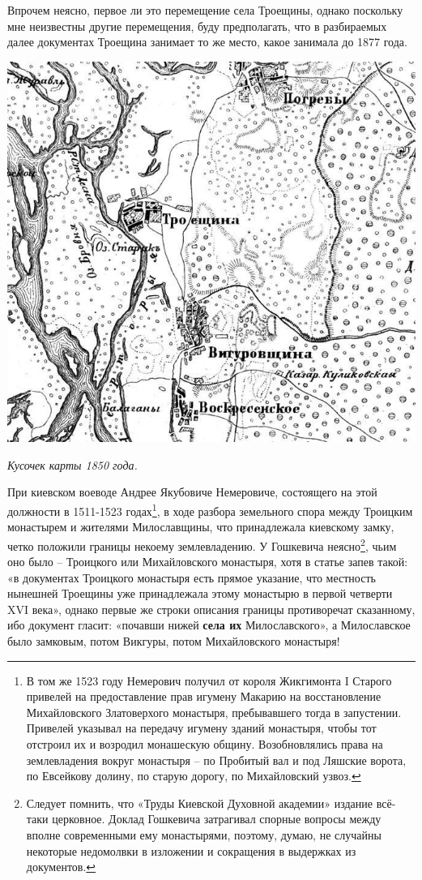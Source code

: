 Впрочем неясно, первое ли это перемещение села Троещины, однако поскольку мне неизвестны другие перемещения, буду предполагать, что в разбираемых далее документах Троещина занимает то же место, какое занимала до 1877 года.

\begin{center}
\includegraphics[width=\linewidth]{chast-gorodki/star-ist/1850.jpg}

\textit{Кусочек карты 1850 года.}
\end{center}

При киевском воеводе Андрее Якубовиче Немеровиче, состоящего на этой должности в 1511-1523 годах\footnote{В том же 1523 году Немерович получил от короля Жикгимонта I Старого привелей на предоставление прав игумену Макарию на восстановление Михайловского Златоверхого монастыря, пребывавшего тогда в запустении. Привелей указывал на передачу игумену зданий монастыря, чтобы тот отстроил их и возродил монашескую общину. Возобновлялись права на землевладения вокруг монастыря – по Пробитый вал и под Ляшские ворота, по Евсейкову долину, по старую дорогу, по Михайловский узвоз.}, в ходе разбора земельного спора между Троицким монастырем и жителями Милославщины, что принадлежала киевскому замку, четко положили границы некоему землевладению. У Гошкевича неясно\footnote{Следует помнить, что «Труды Киевской Духовной академии» издание всё-таки церковное. Доклад Гошкевича затрагивал спорные вопросы между вполне современными ему монастырями, поэтому, думаю, не случайны некоторые недомолвки в изложении и сокращения в выдержках из документов.}, чьим оно было – Троицкого или Михайловского монастыря, хотя в статье запев такой: «в документах Троицкого монастыря есть прямое указание, что местность нынешней Троещины уже принадлежала этому монастырю в первой четверти XVI века», однако первые же строки описания границы противоречат сказанному, ибо документ гласит: «почавши нижей \textbf{села их} Милославского», а Милославское было замковым, потом Викгуры, потом Михайловского монастыря!

